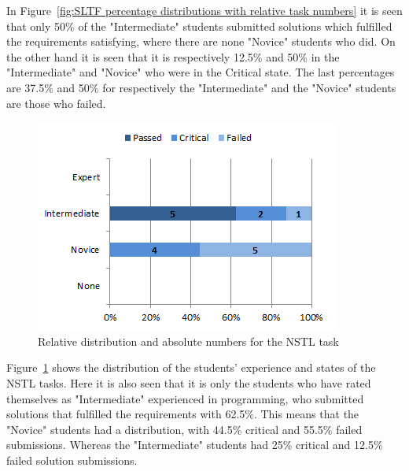 \documentclass{sig-alternate-05-2015}
\begin{document}
In Figure~\ref{fig:SLTF percentage distributions with relative task numbers} it is seen that only 50\% of the "Inter\-mediate" students submitted solutions which fulfilled the requirements satisfying, where there are none "Novice" students who did. On the other hand it is seen that it is respectively 12.5\% and 50\% in the "Intermediate" and "Novice" who were in the Critical state. The last percentages are 37.5\% and 50\% for respectively the "Intermediate" and the "Novice" students are those who failed.

\begin{figure}[!ht]
	\centering
	\includegraphics[width=1\linewidth]{img08}
	\caption{Relative distribution and absolute numbers for the NSTL task}
	\label{fig:NSTL percentage distributions with relative task numbers}
\end{figure}

Figure~\ref{fig:NSTL percentage distributions with relative task numbers} shows the distribution of the students' ex\-perience and states of the NSTL tasks. Here it is also seen that it is only the students who have rated themselves as "Inter\-mediate" experienced in programming, who submitted solutions that fulfilled the requirements with 62.5\%. This means that the "Novice" students had a distribution, with 44.5\% critical and 55.5\% failed submissions. Whereas the "Inter\-mediate" students had 25\% critical and 12.5\% failed solution submissions.
\end{document}
